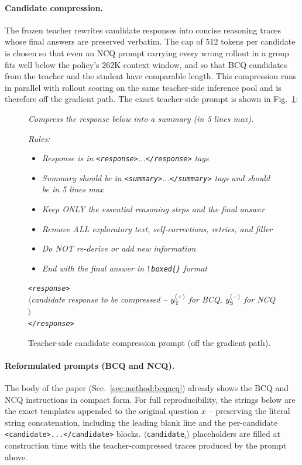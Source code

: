 \documentclass{llmxive}
\begin{document}
\paragraph{Candidate compression.}
The frozen teacher rewrites candidate responses into concise reasoning traces whose final answers are preserved verbatim. The cap of $512$ tokens per candidate is chosen so that even an NCQ prompt carrying every wrong rollout in a group fits well below the policy's $262$K context window, and so that BCQ candidates from the teacher and the student have comparable length. This compression runs in parallel with rollout scoring on the same teacher-side inference pool and is therefore off the gradient path. The exact teacher-side prompt is shown in Fig.~\ref{fig:prompt-compression}:
\begin{figure}[!htbp]
\begin{prompttemplatefig}
\small
\emph{Compress the response below into a summary (in 5 lines max).}

\emph{Rules:}
\begin{itemize}[leftmargin=12pt,topsep=1pt,itemsep=1pt]
    \item \emph{Response is in \texttt{<response>}...\texttt{</response>} tags}
    \item \emph{Summary should be in \texttt{<summary>}...\texttt{</summary>} tags and should be in 5 lines max}
    \item \emph{Keep ONLY the essential reasoning steps and the final answer}
    \item \emph{Remove ALL exploratory text, self-corrections, retries, and filler}
    \item \emph{Do NOT re-derive or add new information}
    \item \emph{End with the final answer in \texttt{\textbackslash boxed\{\}} format}
\end{itemize}
\emph{\texttt{<response>}\\
$\langle$\emph{candidate response to be compressed} -- $y_{\rm T}^{(+)}$ for BCQ, $y_{\rm S}^{(-)}$ for NCQ$\rangle$\\
\texttt{</response>}}
\end{prompttemplatefig}
\caption{Teacher-side candidate compression prompt (off the gradient path).}
\label{fig:prompt-compression}
\end{figure}

\paragraph{Reformulated prompts (BCQ and NCQ).}
The body of the paper (Sec.~\ref{sec:method:bcqncq}) already shows the BCQ and NCQ instructions in compact form. For full reproducibility, the strings below are the exact templates appended to the original question $x$ -- preserving the literal string concatenation, including the leading blank line and the per-candidate \texttt{<candidate>...</candidate>} blocks. \texttt{$\langle$candidate$_i\rangle$} placeholders are filled at construction time with the teacher-compressed traces produced by the prompt above.
\end{document}
